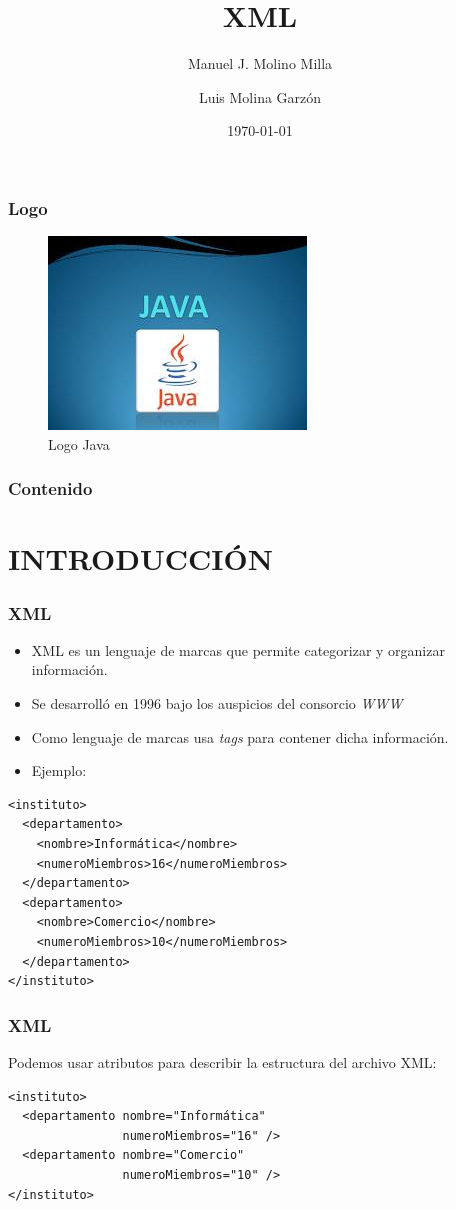 \documentclass{beamer}
\title{XML}
\author{Manuel J. Molino Milla \and Luis Molina Garzón}
\date{\today} %
\institute{IES Virgen del Carmen \and Departamento de Informática}
\begin{document}
\begin{frame}
  \titlepage
\end{frame}

\begin{frame}
    \frametitle{Logo}
\begin{figure}
\includegraphics[scale=1]{imagenes/logo.jpeg} 
\caption{Logo Java}
\end{figure}
\end{frame}

\begin{frame}
  \frametitle{Contenido}
  \tableofcontents[pausesections]
\end{frame}



\section{INTRODUCCIÓN}


\begin{frame}[fragile]
\frametitle{XML}
\begin{itemize}[<+->]
\item \alert{XML} es un lenguaje de marcas que permite categorizar y organizar información.
\item Se desarrolló en 1996 bajo los auspicios del consorcio \emph{WWW}
\item Como lenguaje de marcas usa \emph{tags} para contener dicha información.
\item Ejemplo:
\end{itemize}
\begin{verbatim}
<instituto>
  <departamento>
    <nombre>Informática</nombre>
    <numeroMiembros>16</numeroMiembros>
  </departamento>
  <departamento>
    <nombre>Comercio</nombre>
    <numeroMiembros>10</numeroMiembros>
  </departamento>
</instituto>
  \end{verbatim}
\end{frame}

\begin{frame}[fragile]
\frametitle{XML}
Podemos usar atributos para describir la estructura del archivo XML:
\begin{verbatim}
<instituto>
  <departamento nombre="Informática"
                numeroMiembros="16" />
  <departamento nombre="Comercio"
                numeroMiembros="10" />
</instituto>
\end{verbatim}
\end{frame}
\end{document}
